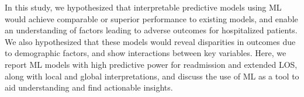In this study, we hypothesized that interpretable predictive models using ML would achieve comparable 
or superior performance to existing models, and enable an understanding of factors leading to adverse 
outcomes for hospitalized patients. 
We also hypothesized that these models would reveal disparities in outcomes due to demographic factors, 
and show interactions between key variables. 
Here, we report ML models with high predictive power for readmission and extended LOS, 
along with local and global interpretations, and discuss the use of ML as a tool to aid understanding and find actionable insights.
